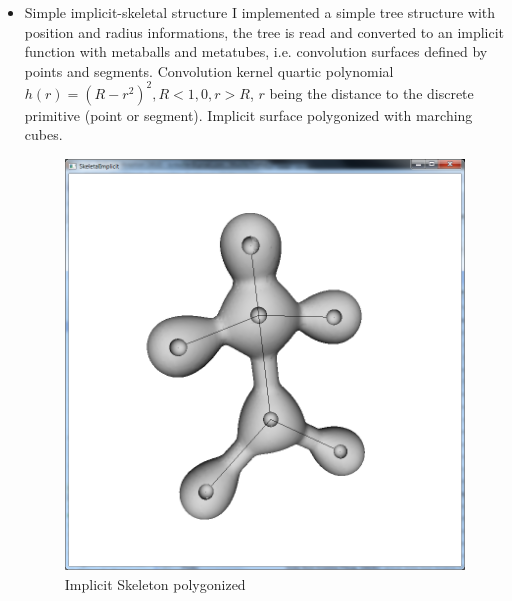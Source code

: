 \documentclass[11pt]{article}
\numberwithin{figure}{section}
\begin{document}
\begin{itemize}
\item{Simple implicit-skeletal structure}
I implemented a simple tree structure with position and radius informations, the tree is read and converted to an implicit function with metaballs and metatubes, i.e. convolution surfaces defined by points and segments. Convolution kernel quartic polynomial $h(r)= (R-r^2)^2,  R < 1, 0, r > R$, $r$ being the distance to the discrete primitive (point or segment). Implicit surface polygonized with marching cubes.

\begin{figure}[!h!]
\centering
\includegraphics[scale=0.3]{../pictures/metaGuy.png}
\caption{Implicit Skeleton polygonized}
\label{bilb}
\end{figure}


\end{itemize}
\end{document}
